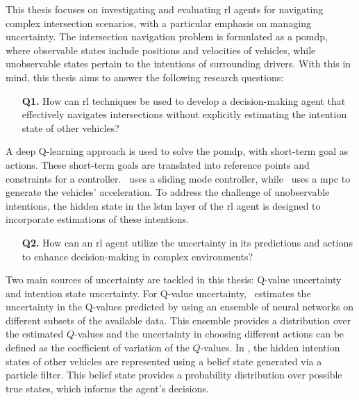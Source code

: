 
This thesis focuses on investigating and evaluating \gls{rl} agents for navigating complex intersection scenarios, with a particular emphasis on managing uncertainty. 
The intersection navigation problem is formulated as a \gls{pomdp}, where observable states include positions and velocities of vehicles, while unobservable states pertain to the intentions of surrounding drivers. With this in mind, this thesis aims to answer the following research questions:

\begin{enumerate}
	\item[\textbf{Q1.}] How can \gls{rl} techniques be used to develop a decision-making agent that effectively navigates intersections without explicitly estimating the intention state of other vehicles?
\end{enumerate}
A deep Q-learning approach is used to solve the \gls{pomdp}, with short-term goal as actions. These short-term goals are translated into reference points and constraints for a controller. \paperLSTM \ uses a sliding mode controller, while \paperMPC \ uses a \gls{mpc} to generate the vehicles' acceleration.
To address the challenge of unobservable intentions, the hidden state in the \gls{lstm} layer of the \gls{rl} agent is designed to incorporate estimations of these intentions.

\begin{enumerate}
	\item[\textbf{Q2.}] How can an \gls{rl} agent utilize the uncertainty in its predictions and actions to enhance decision-making in complex environments? 
\end{enumerate}
Two main sources of uncertainty are tackled in this thesis: Q-value uncertainty and intention state uncertainty.
For Q-value uncertainty, \paperEnsamble \ estimates the uncertainty in the Q-values predicted by using an ensemble of neural networks on different subsets of the available data. This ensemble provides a distribution over the estimated $Q$-values and the uncertainty in choosing different actions can be defined as the coefficient of variation of the $Q$-values.
In \paperBelief, the hidden intention states of other vehicles are represented using a belief state generated via a particle filter. This belief state provides a probability distribution over possible true states, which informs the agent's decisions.

